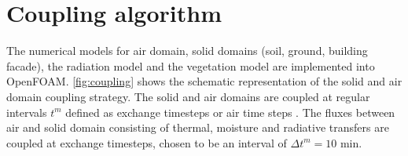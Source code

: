 %



\section{Coupling algorithm}
\label{sec:couplingalgorithm}

The numerical models for air domain, solid domains (soil, ground, building facade), the radiation model and the vegetation model are implemented into OpenFOAM. \cref{fig:coupling} shows the schematic representation of the solid and air domain coupling strategy. The solid and air domains are coupled at regular intervals $t^m$ defined as exchange timesteps or air time steps \citep{Saneinejad2014,Kubilay2018}. The fluxes between air and solid domain consisting of thermal, moisture and radiative transfers are coupled at exchange timesteps, chosen to be an interval of $\Delta t^m = 10$ min.

